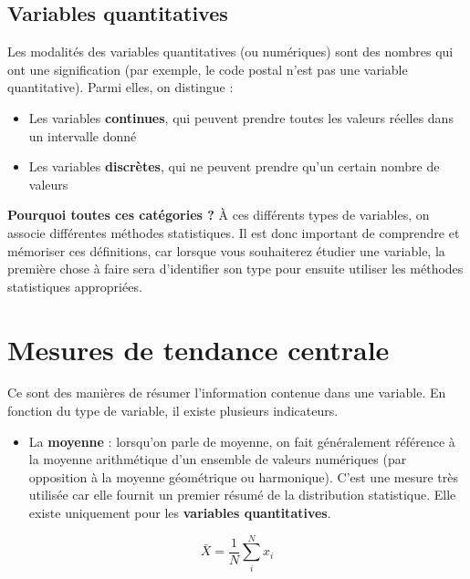 \documentclass[
  french,
]{book}
\providecommand{\tightlist}{%
  \setlength{\itemsep}{0pt}\setlength{\parskip}{0pt}}
\begin{document}
\hypertarget{variables-quantitatives}{%
\subsection{Variables quantitatives}\label{variables-quantitatives}}

Les modalités des variables quantitatives (ou numériques) sont des nombres qui ont une signification (par exemple, le code postal n'est pas une variable quantitative). Parmi elles, on distingue :

\begin{itemize}
\tightlist
\item
  Les variables \textbf{continues}, qui peuvent prendre toutes les valeurs réelles dans un intervalle donné
\item
  Les variables \textbf{discrètes}, qui ne peuvent prendre qu'un certain nombre de valeurs
\end{itemize}

\textbf{Pourquoi toutes ces catégories ?} À ces différents types de variables, on associe différentes méthodes statistiques. Il est donc important de comprendre et mémoriser ces définitions, car lorsque vous souhaiterez étudier une variable, la première chose à faire sera d'identifier son type pour ensuite utiliser les méthodes statistiques appropriées.

\hypertarget{mesures-de-tendance-centrale}{%
\section{Mesures de tendance centrale}\label{mesures-de-tendance-centrale}}

Ce sont des manières de résumer l'information contenue dans une variable. En fonction du type de variable, il existe plusieurs indicateurs.

\begin{itemize}
\tightlist
\item
  La \textbf{moyenne} : lorsqu'on parle de moyenne, on fait généralement référence à la moyenne arithmétique d'un ensemble de valeurs numériques (par opposition à la moyenne géométrique ou harmonique). C'est une mesure très utilisée car elle fournit un premier résumé de la distribution statistique. Elle existe uniquement pour les \textbf{variables quantitatives}.
\end{itemize}

\[ \bar{X} = \frac{1}{N}\sum_{i}^{N}{x_i} \]
\end{document}
